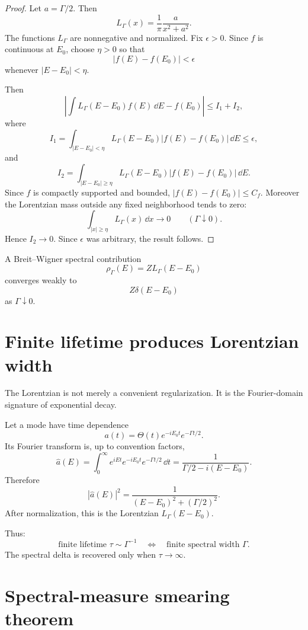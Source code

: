 \documentclass[11pt]{article}
\begin{document}
\begin{proof}
Let $a=\Gamma/2$. Then
\[
L_\Gamma(x)=\frac{1}{\pi}\frac{a}{x^2+a^2}.
\]
The functions $L_\Gamma$ are nonnegative and normalized. Fix $\epsilon>0$. Since $f$ is continuous at $E_0$, choose $\eta>0$ so that
\[
|f(E)-f(E_0)|<\epsilon
\]
whenever $|E-E_0|<\eta$.

Then
\[
\left|\int L_\Gamma(E-E_0)f(E)\,\dd E-f(E_0)\right|
\le I_1+I_2,
\]
where
\[
I_1=
\int_{|E-E_0|<\eta}L_\Gamma(E-E_0)|f(E)-f(E_0)|\,\dd E
\le \epsilon,
\]
and
\[
I_2=
\int_{|E-E_0|\ge \eta}L_\Gamma(E-E_0)|f(E)-f(E_0)|\,\dd E.
\]
Since $f$ is compactly supported and bounded, $|f(E)-f(E_0)|\le C_f$. Moreover the Lorentzian mass outside any fixed neighborhood tends to zero:
\[
\int_{|x|\ge \eta}L_\Gamma(x)\,\dd x\to0
\qquad(\Gamma\downarrow0).
\]
Hence $I_2\to0$. Since $\epsilon$ was arbitrary, the result follows.
\end{proof}

\begin{corollary}
A Breit--Wigner spectral contribution
\[
\rho_\Gamma(E)=ZL_\Gamma(E-E_0)
\]
converges weakly to
\[
Z\delta(E-E_0)
\]
as $\Gamma\downarrow0$.
\end{corollary}

\section{Finite lifetime produces Lorentzian width}

The Lorentzian is not merely a convenient regularization. It is the Fourier-domain signature of exponential decay.

Let a mode have time dependence
\[
a(t)=\Theta(t)e^{-iE_0t}e^{-\Gamma t/2}.
\]
Its Fourier transform is, up to convention factors,
\[
\widehat a(E)
=
\int_0^\infty e^{iEt}e^{-iE_0t}e^{-\Gamma t/2}\,\dd t
=
\frac{1}{\Gamma/2-i(E-E_0)}.
\]
Therefore
\[
|\widehat a(E)|^2
=
\frac{1}{(E-E_0)^2+(\Gamma/2)^2}.
\]
After normalization, this is the Lorentzian $L_\Gamma(E-E_0)$.

Thus:
\[
\boxed{
\text{finite lifetime } \tau\sim \Gamma^{-1}
\quad\Longleftrightarrow\quad
\text{finite spectral width } \Gamma.
}
\]
The spectral delta is recovered only when $\tau\to\infty$.

\section{Spectral-measure smearing theorem}
\end{document}
